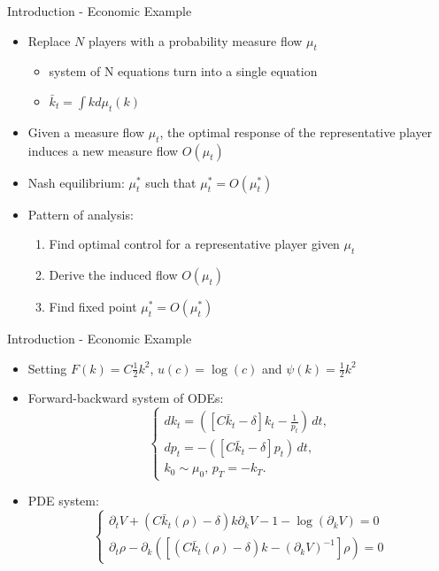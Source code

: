 \documentclass{beamer}
\begin{document}
\begin{frame}{Introduction - Economic Example}
\begin{itemize}

    \item Replace $N$ players with a probability measure flow $\mu_t$
    \begin{itemize}
        \item system of N equations turn into a single equation
        \item $\bar k_t = \int k d \mu_t(k)$
    \end{itemize}
    \item Given a measure flow $\mu_t$, the optimal response of the representative player induces a new measure flow $O(\mu_t)$
    \item Nash equilibrium: $\mu_t^*$ such that $\mu_t^* = O(\mu_t^*)$
    \item Pattern of analysis:
    \begin{enumerate}
        \item Find optimal control for a representative player given $\mu_t$
        \item Derive the induced flow $O(\mu_t)$
        \item Find fixed point $\mu_t^* = O(\mu_t^*)$
    \end{enumerate}
\end{itemize}
\end{frame}

\begin{frame}{Introduction - Economic Example}
\begin{itemize}
\item Setting $F(k) = C \frac{1}{2}k^2$, $u(c) = \log(c)$ and $\psi(k) = \frac{1}{2} k^2$

    \item Forward-backward system of ODEs:
    \begin{equation}
        \begin{cases}
             d k_t = \left(\left[ C {\bar k_t} - \delta \right] k_t - \frac{1}{p_t} \right)\, dt,\\
             d p_t = - \left( \left[C{\bar k_t} - \delta \right] p_t \right) \, dt, \\
             k_0 \sim \mu_0,\, p_T =  - k_T.         
        \end{cases}
    \end{equation}
    \item PDE system:
    \begin{equation}
        \begin{cases}
            \partial_t V +  \left(C {\bar k_t(\rho) - \delta}\right)k\partial_k V - 1  - \log(\partial_k V) = 0 \\
            \partial_t \rho - \partial_k \left( \left[ \left(C {\bar k_t}(\rho) - \delta\right) k - {(\partial_k V)}^{-1} \right]\rho \right) = 0
        \end{cases}
    \end{equation}
\end{itemize}
\end{frame}
\end{document}
